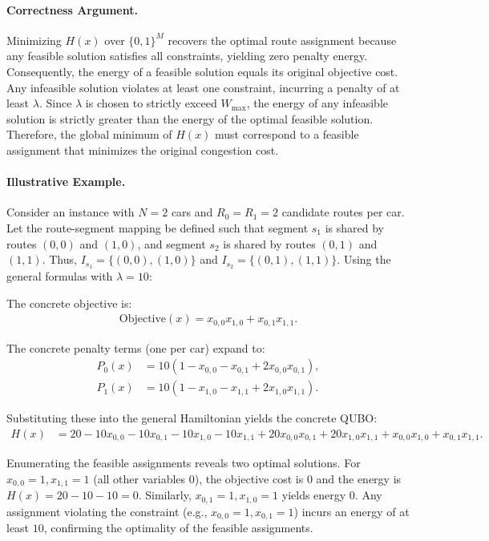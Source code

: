 \documentclass[12pt]{article}
\begin{document}
\paragraph{Correctness Argument.}
Minimizing $H(x)$ over $\{0,1\}^M$ recovers the optimal route assignment because any feasible solution satisfies all constraints, yielding zero penalty energy. Consequently, the energy of a feasible solution equals its original objective cost. Any infeasible solution violates at least one constraint, incurring a penalty of at least $\lambda$. Since $\lambda$ is chosen to strictly exceed $W_{\max}$, the energy of any infeasible solution is strictly greater than the energy of the optimal feasible solution. Therefore, the global minimum of $H(x)$ must correspond to a feasible assignment that minimizes the original congestion cost.

\paragraph{Illustrative Example.}
Consider an instance with $N=2$ cars and $R_0=R_1=2$ candidate routes per car. Let the route-segment mapping be defined such that segment $s_1$ is shared by routes $(0,0)$ and $(1,0)$, and segment $s_2$ is shared by routes $(0,1)$ and $(1,1)$. Thus, $I_{s_1} = \{(0,0), (1,0)\}$ and $I_{s_2} = \{(0,1), (1,1)\}$. Using the general formulas with $\lambda = 10$:

The concrete objective is:
\begin{align}
  \text{Objective}(x) = x_{0,0} x_{1,0} + x_{0,1} x_{1,1}.
\end{align}

The concrete penalty terms (one per car) expand to:
\begin{align}
  P_0(x) &= 10 \left( 1 - x_{0,0} - x_{0,1} + 2 x_{0,0} x_{0,1} \right), \\
  P_1(x) &= 10 \left( 1 - x_{1,0} - x_{1,1} + 2 x_{1,0} x_{1,1} \right).
\end{align}

Substituting these into the general Hamiltonian yields the concrete QUBO:
\begin{align}
  H(x) &= 20 - 10 x_{0,0} - 10 x_{0,1} - 10 x_{1,0} - 10 x_{1,1} + 20 x_{0,0} x_{0,1} + 20 x_{1,0} x_{1,1} + x_{0,0} x_{1,0} + x_{0,1} x_{1,1}.
\end{align}

Enumerating the feasible assignments reveals two optimal solutions. For $x_{0,0}=1, x_{1,1}=1$ (all other variables $0$), the objective cost is $0$ and the energy is $H(x) = 20 - 10 - 10 = 0$. Similarly, $x_{0,1}=1, x_{1,0}=1$ yields energy $0$. Any assignment violating the constraint (e.g., $x_{0,0}=1, x_{0,1}=1$) incurs an energy of at least $10$, confirming the optimality of the feasible assignments.
\end{document}
